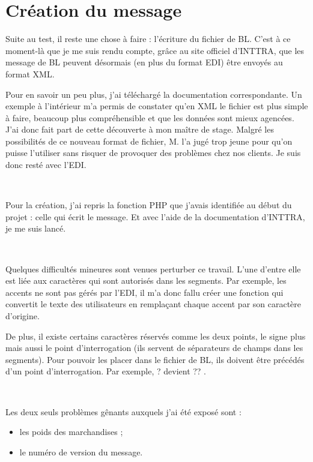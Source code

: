 \section{Création du message}
Suite au test, il reste une chose à faire : l'écriture du fichier de BL. C'est à ce moment-là que je me suis rendu compte, grâce au site officiel d'INTTRA, que les message de BL peuvent désormais (en plus du format EDI) être envoyés au format XML.

Pour en savoir un peu plus, j'ai téléchargé la documentation correspondante. Un exemple à l'intérieur m'a permis de constater qu'en XML le fichier est plus simple à faire, beaucoup plus compréhensible et que les données sont mieux agencées. J'ai donc fait part de cette découverte à mon maître de stage. Malgré les possibilités de ce nouveau format de fichier, M.  l'a jugé trop \og jeune \fg pour qu'on puisse l'utiliser sans risquer de provoquer des problèmes chez nos clients. Je suis donc resté avec l'EDI.

~

Pour la création, j'ai repris la fonction PHP que j'avais identifiée au début du projet : celle qui écrit le message. Et avec l'aide de la documentation d'INTTRA, je me suis lancé.

~

Quelques difficultés mineures sont venues perturber ce travail. L'une d'entre elle est liée aux caractères qui sont autorisés dans les segments. Par exemple, les accents ne sont pas gérés par l'EDI, il m'a donc fallu créer une fonction qui convertit le texte des utilisateurs en remplaçant chaque accent par son caractère d'origine.

De plus, il existe certains caractères réservés comme les deux points, le signe plus mais aussi le point d'interrogation (ils servent de séparateurs de champs dans les segments). Pour pouvoir les placer dans le fichier de BL, ils doivent être précédés d'un point d'interrogation. Par exemple, \og ? \fg{} devient \og ?? \fg.

~

Les deux seuls problèmes gênants auxquels j'ai été exposé sont :
\begin{itemize}
	\item les poids des marchandises ;
	\item le numéro de version du message.
\end{itemize}